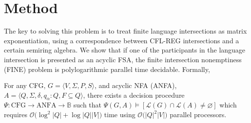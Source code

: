 \documentclass[sigplan,review,acmsmall,nonacm,screen,anonymous]{acmart}\settopmatter{printfolios=false,printccs=false,printacmref=false}
\begin{document}

\clearpage\section{Method}\label{sec:method}

The key to solving this problem is to treat finite language intersections as matrix exponentiation, using a correspondence between CFL-REG intersections and a certain semiring algebra. We show that if one of the participants in the language intersection is presented as an acyclic FSA, the finite intersection nonemptiness (FINE) problem is polylogarithmic parallel time decidable. Formally,

\begin{theorem}%
  For any CFG, $G = \langle V, \Sigma, P, S\rangle$, and acyclic NFA (ANFA), $A = \langle Q, \Sigma, \delta, q_\alpha: Q, F \subseteq Q\rangle$, there exists a decision procedure $\Psi: \text{CFG} \rightarrow \text{ANFA} \rightarrow \mathbb{B}$ such that $\Psi(G, A) \models [\mathcal{L}(G)\cap\mathcal{L}(A) \neq \varnothing]$ which requires $\mathcal{O}\big(\log^2|Q|+\log|Q||V|\big)$ time using $\mathcal{O}\big(|Q|^2|V|\big)$ parallel processors.
\end{theorem}
\end{document}
